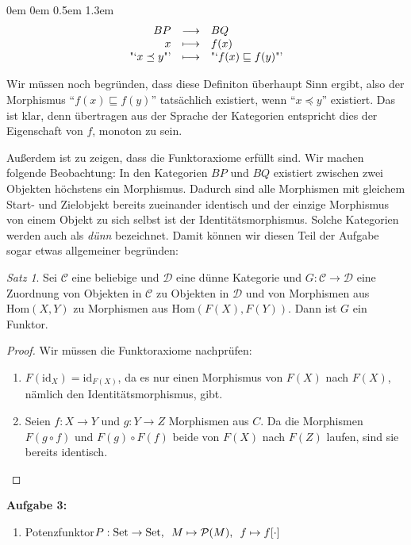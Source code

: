 \documentclass[a4paper,ngerman]{scrartcl}
\theoremstyle{definition}
\theoremstyle{plain}
\theoremstyle{remark}
\newtheorem*{satz}{Satz}
\newcommand{\C}{\mathcal{C}}
\newcommand{\Hom}{\mathrm{Hom}}
\newcommand{\Set}{\mathrm{Set}}
\newcommand{\id}{\mathrm{id}}
\newcommand{\D}{\mathcal{D}}
\begin{document}
\begin{list}{}{0em \leftmargin0em \itemindent0.5em \itemsep 1.3em}
\[ \begin{array}{@{}rcl@{}}
  BP &\longrightarrow& BQ\\
  x  &\longmapsto& f(x)\\
  \text{"`$x \preceq y$"'} &\longmapsto& \text{"`$f(x) \sqsubseteq f(y)$"'}
\end{array} \]

Wir müssen noch begründen, dass diese Definiton überhaupt Sinn ergibt, also der Morphismus "`$f(x) \sqsubseteq f(y)$"' tatsächlich existiert, wenn "`$x \preceq y$"' existiert. Das ist klar, denn übertragen aus der Sprache der Kategorien entspricht dies der Eigenschaft von $f$, monoton zu sein.

Außerdem ist zu zeigen, dass die Funktoraxiome erfüllt sind. Wir machen folgende Beobachtung: In den Kategorien $BP$ und $BQ$ existiert zwischen zwei Objekten höchstens ein Morphismus. Dadurch sind alle Morphismen mit gleichem Start- und Zielobjekt bereits zueinander identisch und der einzige Morphismus von einem Objekt zu sich selbst ist der Identitätsmorphismus. Solche Kategorien werden auch als \emph{dünn} bezeichnet. Damit können wir diesen Teil der Aufgabe sogar etwas allgemeiner begründen:\\


\begin{satz}
  Sei $\C$ eine beliebige und $\D$ eine dünne Kategorie und $G : \C \to \D$ eine Zuordnung von Objekten in $\C$ zu Objekten in $\D$ und von Morphismen aus $\Hom(X, Y)$ zu Morphismen aus $\Hom(F(X), F(Y))$. Dann ist $G$ ein Funktor.
\end{satz}

\begin{proof}
Wir müssen die Funktoraxiome nachprüfen:
\begin{enumerate}
\item $F(\id_X) = \id_{F(X)}$, da es nur einen Morphismus von $F(X)$ nach $F(X)$, nämlich den Identitätsmorphismus, gibt.
\item Seien $f : X \to Y$ und $g : Y \to Z$ Morphismen aus $C$. Da die Morphismen $F(g \circ f)$ und $F(g) \circ F(f)$ beide von $F(X)$ nach $F(Z)$ laufen, sind sie bereits identisch.\qedhere
\end{enumerate}
\end{proof}

\item[\textbf{Aufgabe 3:}]\mbox{}

\begin{enumerate}
\item Potenzfunktor\enskip$P : \Set \to \Set, \enskip M \mapsto \mathcal{P}(M), \enskip f \mapsto f[\cdot]$


\end{enumerate}
\end{list}
\end{document}
